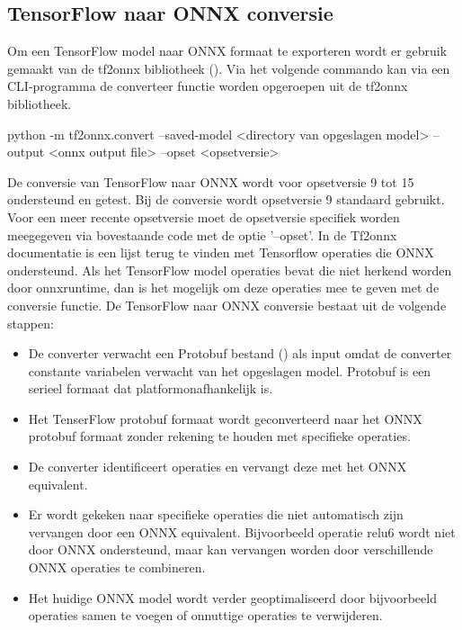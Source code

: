 \subsection{TensorFlow naar ONNX conversie}
Om een TensorFlow model naar ONNX formaat te exporteren wordt er gebruik gemaakt van de tf2onnx bibliotheek (\cite{onnx_tf2onnx_2021}).
Via het volgende commando kan via een CLI-programma de converteer functie worden opgeroepen uit de tf2onnx bibliotheek.

\begin{python}
python -m tf2onnx.convert --saved-model <directory van opgeslagen model> 
		--output <onnx output file> --opset <opsetversie>
\end{python}

De conversie van TensorFlow naar ONNX wordt voor opsetversie 9 tot 15 ondersteund en getest.
Bij de conversie wordt opsetversie 9 standaard gebruikt.
Voor een meer recente opsetversie moet de opsetversie specifiek worden meegegeven via bovestaande code met de optie '--opset'.
In de Tf2onnx documentatie is een lijst terug te vinden met Tensorflow operaties die ONNX ondersteund.
Als het TensorFlow model operaties bevat die niet herkend worden door onnxruntime, dan is het mogelijk om deze operaties mee te geven met de conversie functie.
De TensorFlow naar ONNX conversie bestaat uit de volgende stappen: 

\begin{itemize}
	\item De converter verwacht een Protobuf bestand (\cite{Google_protocol_2014}) als input omdat de converter constante variabelen verwacht van het opgeslagen model. Protobuf is een serieel formaat dat platformonafhankelijk is.
	\item Het TenserFlow protobuf formaat wordt geconverteerd naar het ONNX protobuf formaat zonder rekening te houden met specifieke operaties.
	\item De converter identificeert operaties en vervangt deze met het ONNX equivalent.
	\item Er wordt gekeken naar specifieke operaties die niet automatisch zijn vervangen door een ONNX equivalent. Bijvoorbeeld operatie relu6 wordt niet door ONNX ondersteund, maar kan vervangen worden door verschillende ONNX operaties te combineren.
	\item Het huidige ONNX model wordt verder geoptimaliseerd door bijvoorbeeld operaties samen te voegen of onnuttige operaties te verwijderen.
\end{itemize}

